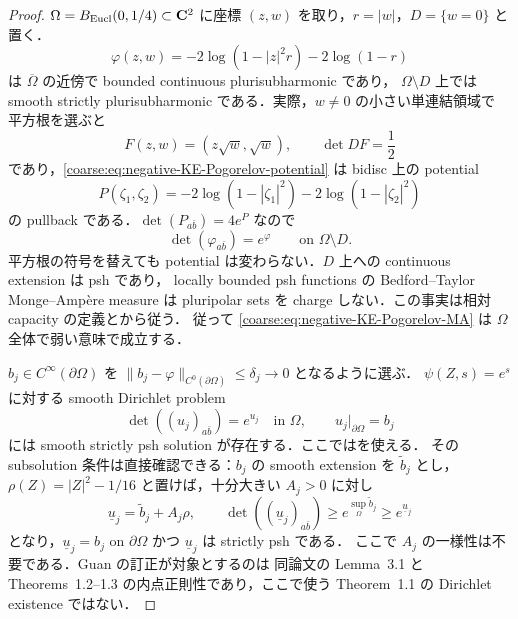 \documentclass[a4paper,11pt]{ltjsarticle}
\numberwithin{equation}{section}
\theoremstyle{plain}
\theoremstyle{definition}
\theoremstyle{remark}
\begin{document}
\begin{proof}
$\Omega=B_{\mathrm{Eucl}}(0,1/4)\subset\mathbf C^2$ に座標 $(z,w)$ を取り，$r=|w|$，$D=\{w=0\}$ と置く．
\begin{equation}\label{coarse:eq:negative-KE-Pogorelov-potential}
 \varphi(z,w)=-2\log(1-|z|^2r)-2\log(1-r)
\end{equation}
は $\overline\Omega$ の近傍で bounded continuous plurisubharmonic であり，
$\Omega\setminus D$ 上では smooth strictly plurisubharmonic である．実際，$w\ne0$ の小さい単連結領域で
平方根を選ぶと
\[
 F(z,w)=(z\sqrt w,\sqrt w),\qquad \det DF=\frac12
\]
であり，\eqref{coarse:eq:negative-KE-Pogorelov-potential} は bidisc 上の potential
\[
 P(\zeta_1,\zeta_2)
 =-2\log(1-|\zeta_1|^2)-2\log(1-|\zeta_2|^2)
\]
の pullback である．$\det(P_{a\bar b})=4e^P$ なので
\begin{equation}\label{coarse:eq:negative-KE-Pogorelov-MA}
 \det(\varphi_{a\bar b})=e^{\varphi}
 \qquad\text{on }\Omega\setminus D.
\end{equation}
平方根の符号を替えても potential は変わらない．$D$ 上への continuous extension は psh であり，
locally bounded psh functions の Bedford--Taylor Monge--Amp\`ere measure は pluripolar sets を
charge しない．この事実は相対 capacity の定義と\cite[Theorem~6.9]{BedfordTaylorCapacity}から従う．
従って \eqref{coarse:eq:negative-KE-Pogorelov-MA} は $\Omega$ 全体で弱い意味で成立する．

$b_j\in C^\infty(\partial\Omega)$ を
$\|b_j-\varphi\|_{C^0(\partial\Omega)}\le\delta_j\to0$ となるように選ぶ．
$\psi(Z,s)=e^s$ に対する smooth Dirichlet problem
\begin{equation}\label{coarse:eq:negative-KE-Dirichlet-approximation}
 \det((u_j)_{a\bar b})=e^{u_j}\quad\text{in }\Omega,
 \qquad u_j|_{\partial\Omega}=b_j
\end{equation}
には smooth strictly psh solution が存在する．ここでは\cite[Theorem~1.1]{GuanDirichlet}を使える．
その subsolution 条件は直接確認できる：$b_j$ の smooth extension を $\widetilde b_j$ とし，
$\rho(Z)=|Z|^2-1/16$ と置けば，十分大きい $A_j>0$ に対し
\[
 \underline u_j=\widetilde b_j+A_j\rho,
 \qquad
 \det((\underline u_j)_{a\bar b})
 \ge e^{\sup_\Omega\widetilde b_j}\ge e^{\underline u_j}
\]
となり，$\underline u_j=b_j$ on $\partial\Omega$ かつ $\underline u_j$ は strictly psh である．
ここで $A_j$ の一様性は不要である．Guan の訂正\cite{GuanDirichletCorrection}が対象とするのは
同論文の Lemma~3.1 と Theorems~1.2--1.3 の内点正則性であり，ここで使う
Theorem~1.1 の Dirichlet existence ではない．


\end{proof}
\end{document}
